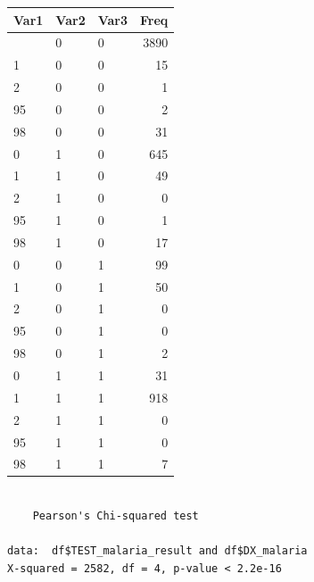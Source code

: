 \documentclass[
  letterpaper,
  DIV=11,
  numbers=noendperiod,
  oneside]{scrreprt}
\newenvironment{Shaded}{\begin{snugshade}}{\end{snugshade}}
\newcommand{\FunctionTok}[1]{\textcolor[rgb]{0.28,0.35,0.67}{#1}}
\newcommand{\NormalTok}[1]{\textcolor[rgb]{0.00,0.23,0.31}{#1}}
\newcommand{\SpecialCharTok}[1]{\textcolor[rgb]{0.37,0.37,0.37}{#1}}
\begin{document}
\begin{longtable}[]{@{}lllr@{}}
\toprule\noalign{}
Var1 & Var2 & Var3 & Freq \\
\midrule\noalign{}
\endhead
\bottomrule\noalign{}
\endlastfoot
0 & 0 & 0 & 3890 \\
1 & 0 & 0 & 15 \\
2 & 0 & 0 & 1 \\
95 & 0 & 0 & 2 \\
98 & 0 & 0 & 31 \\
0 & 1 & 0 & 645 \\
1 & 1 & 0 & 49 \\
2 & 1 & 0 & 0 \\
95 & 1 & 0 & 1 \\
98 & 1 & 0 & 17 \\
0 & 0 & 1 & 99 \\
1 & 0 & 1 & 50 \\
2 & 0 & 1 & 0 \\
95 & 0 & 1 & 0 \\
98 & 0 & 1 & 2 \\
0 & 1 & 1 & 31 \\
1 & 1 & 1 & 918 \\
2 & 1 & 1 & 0 \\
95 & 1 & 1 & 0 \\
98 & 1 & 1 & 7 \\
\end{longtable}

\begin{Shaded}
\end{Shaded}

\begin{verbatim}

    Pearson's Chi-squared test

data:  df$TEST_malaria_result and df$DX_malaria
X-squared = 2582, df = 4, p-value < 2.2e-16
\end{verbatim}

\begin{Shaded}
\end{Shaded}
\end{document}
